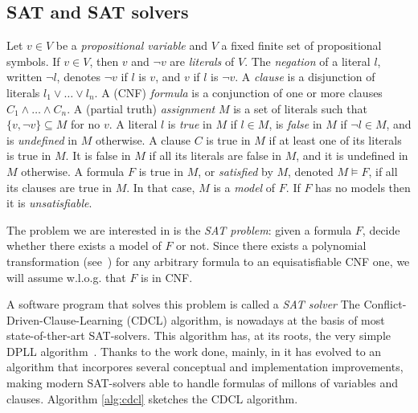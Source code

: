 
\subsection{SAT and SAT solvers}

Let $v \in V $ be a \emph{propositional variable} and $V$
 a fixed finite set of propositional symbols.  If $v \in V$,
then $v$ and $\lnot v$ are \emph{literals} of $V$.  
The \emph{negation} of a literal $l$, written $\lnot l$, denotes 
$\lnot v$ if $l$ is $v$, and $v$ if $l$ is $\lnot v$.
A \emph{clause} is a disjunction of literals $l_1 \lor\ldots\lor l_n$.
A (CNF) \emph{formula} is a conjunction of one or
more clauses $C_1 \land\ldots\land C_n$. 
 A (partial truth) \emph{assignment} $M$ is a
set of literals such that $\{ v, \lnot v \} \subseteq M$ for no $v$. A
literal $l$ is \emph{true} in $M$ if $l \in M$, is \emph{false} in $M$
if $\lnot l \in M$, and is \emph{undefined} in $M$ otherwise. 
A clause $C$ is true in $M$ if at least one of its
literals is true in $M$.  It is false in $M$ if all its literals are
false in $M$, and it is undefined in $M$ otherwise. 
A formula $F$ is true in $M$, or
\emph{satisfied} by $M$, denoted $M\models F$, if all its clauses are
true in $M$.  In that case, $M$ is a \emph{model} of $F$.  If $F$ has
no models then it is \emph{unsatisfiable}.  

The problem we are interested in is the \emph{SAT problem}: given a
formula $F$, decide whether there exists a model of $F$ or not.
Since there exists a polynomial transformation
(see~\cite{Tseitin1968}) for any arbitrary formula to an
equisatisfiable CNF one, we will assume w.l.o.g. that $F$ is in CNF.

A software program that solves this problem is called a \emph{SAT solver}
The Conflict-Driven-Clause-Learning (CDCL) algorithm, is nowadays at the 
basis of most state-of-ther-art SAT-solvers\cite{gluclose,plingeling,cryptominisat}. 
This algorithm has, at its roots, the very 
simple DPLL algorithm~\cite{Davisetal1962CACM}. Thanks to the work done, mainly,
 in \cite{relsat,Chaff2001,GRASP1999IEEE,ZhangStickel1996AIMATH,EenSorensson2003SAT,picosat2008} it has evolved
 to an algorithm that incorpores several conceptual and implementation 
improvements, making modern SAT-solvers able to handle formulas of millons 
of variables and clauses. Algorithm \ref{alg:cdcl} sketches the CDCL algorithm.

